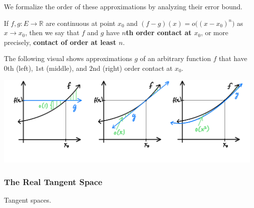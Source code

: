   We formalize the order of these approximations by analyzing their error bound. 

  \begin{definition}
    If $f, g: E \longrightarrow \mathbb{R}$ are continuous at point $x_0$ and $(f - g) (x) = o\big( (x - x_0)^n \big)$ as $x \rightarrow x_0$, then we say that $f$ and $g$ have \textbf{$n$th order contact at $x_0$}, or more precisely, \textbf{contact of order at least $n$}. 

    The following visual shows approximations $g$ of an arbitrary function $f$ that have $0$th (left), $1$st (middle), and $2$nd (right) order contact at $x_0$. 
    \begin{center}
        \includegraphics[scale=0.25]{img/nth_order_contact.PNG}
    \end{center}
  \end{definition}

  \subsubsection{The Real Tangent Space}

  Tangent spaces. 

